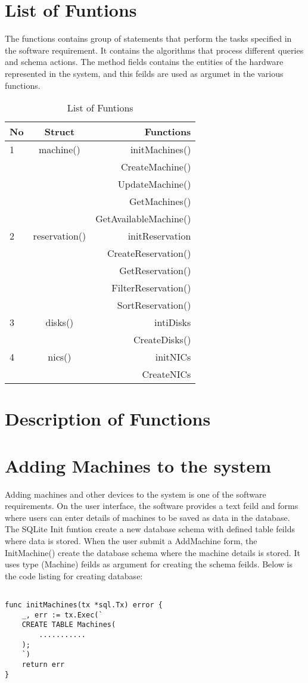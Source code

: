 \section{List of Funtions}
The functions contains group of statements that perform the tasks specified in the software requirement. It contains the algorithms that process different  queries and schema actions. The method fields contains the entities of the hardware represented in the system, and this feilds are used as argumet in the various functions. 
\begin{table}[h!]
  \centering
  \label{tab:table1}
  \begin{tabular}{l|c||r}
    No & Struct& Functions\\
    \hline
    1 &machine() &  initMachines()\\
      && CreateMachine()\\
      &&UpdateMachine()\\
      &&GetMachines()\\
      &&GetAvailableMachine()\\
     \hline
    2 &reservation() & initReservation\\
    && CreateReservation()\\
    && GetReservation()\\
    && FilterReservation()\\
    && SortReservation()\\
    \hline
    3 &disks() & intiDisks\\
    && CreateDisks()\\
    \hline
    4 &nics() & initNICs\\
    && CreateNICs
  \end{tabular}
  \caption{List of Funtions}
\end{table}
\pagebreak
\section{Description of Functions}
\section*{Adding Machines to the system}
Adding machines and other devices to the system is one of the software  requirements. On the user interface, the software provides a text feild and forms where users can enter details of machines to be saved as data in the database. The SQLite Init funtion create a new database schema with defined table feilds where data is stored. When the user submit a AddMachine form, the InitMachine() create the database schema where the machine details is stored. It uses type (Machine) feilds as argument for creating the schema feilds. Below is the code listing for creating database:
\begin{lstlisting}

func initMachines(tx *sql.Tx) error {
	_, err := tx.Exec(`
	CREATE TABLE Machines(
		...........
	);
	`)
	return err
}
\end{lstlisting}

